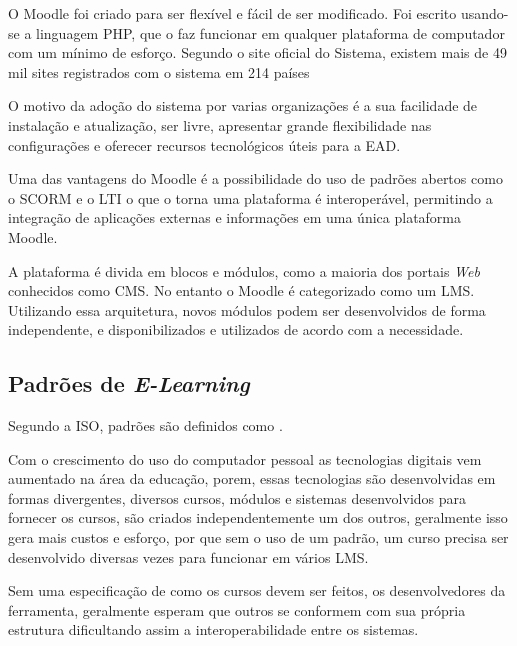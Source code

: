 O \ac{Moodle} foi criado para ser flexível e fácil de ser modificado. Foi escrito usando-se a linguagem \ac{PHP}, que o faz funcionar em qualquer plataforma de computador com um mínimo de esforço. Segundo o site oficial do Sistema, existem mais de 49 mil sites registrados com o sistema em 214 países \cite{moodle-stats}

O motivo da adoção do sistema por varias organizações é a sua facilidade de instalação e atualização, ser livre, apresentar grande flexibilidade nas configurações e oferecer recursos tecnológicos úteis para a EAD.

Uma das vantagens do \ac{Moodle} é a possibilidade do uso de padrões abertos como o \ac{SCORM} e o \ac{LTI} o que o torna uma plataforma é interoperável, permitindo a integração de aplicações externas e informações em uma única plataforma \ac{Moodle}.

A plataforma é divida em blocos e módulos, como a maioria dos portais \textit{Web} conhecidos como \ac{CMS}. No entanto o \ac{Moodle} é categorizado como um \ac{LMS}. Utilizando essa arquitetura, novos módulos podem ser desenvolvidos de forma independente, e disponibilizados e utilizados de acordo com a necessidade.

\subsection{Padrões de \textit{E-Learning}}
Segundo a ISO, padrões são definidos como .

Com o crescimento do uso do computador pessoal as tecnologias digitais vem aumentado na área da educação, porem, essas tecnologias são desenvolvidas em formas divergentes, diversos cursos, módulos e sistemas desenvolvidos para fornecer os cursos, são criados independentemente um dos outros, geralmente isso gera mais custos e esforço, por que sem o uso de um padrão, um curso precisa ser desenvolvido diversas vezes para funcionar em vários \ac{LMS}.

Sem uma especificação de como os cursos devem ser feitos, os desenvolvedores da ferramenta, geralmente esperam que outros se conformem com sua própria estrutura dificultando assim a interoperabilidade entre os sistemas.

